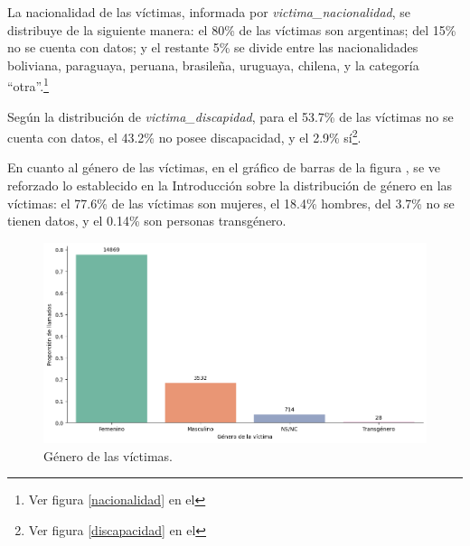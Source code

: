 \documentclass[10 pt]{article}
\begin{document}


La nacionalidad de las víctimas, informada por \textit{victima\_nacionalidad}, se distribuye de la siguiente manera: el 80\% de las víctimas son argentinas; del 15\% no se cuenta con datos; y el restante 5\% se divide entre las nacionalidades boliviana, paraguaya, peruana, brasileña, uruguaya, chilena, y la categoría “otra”.\footnote{Ver figura \ref{nacionalidad} en el }


Según la distribución de \textit{victima\_discapidad}, para el 53.7\% de las víctimas no se cuenta con datos, el 43.2\% no posee discapacidad, y el 2.9\% sí\footnote{Ver figura \ref{discapacidad} en el }. 


En cuanto al género de las víctimas, en el gráfico de barras de la figura , se ve reforzado lo establecido en la Introducción sobre la distribución de género en las víctimas: el 77.6\% de las víctimas son mujeres, el 18.4\% hombres, del 3.7\% no se tienen datos, y el 0.14\% son personas transgénero. 

\begin{figure}[H]
    \begin{center}
    \includegraphics[scale=.5]{images/latex_genero_victima.png}
    \caption{Género de las víctimas.}
    \label{genero}
    \end{center}
    \end{figure}
\end{document}
